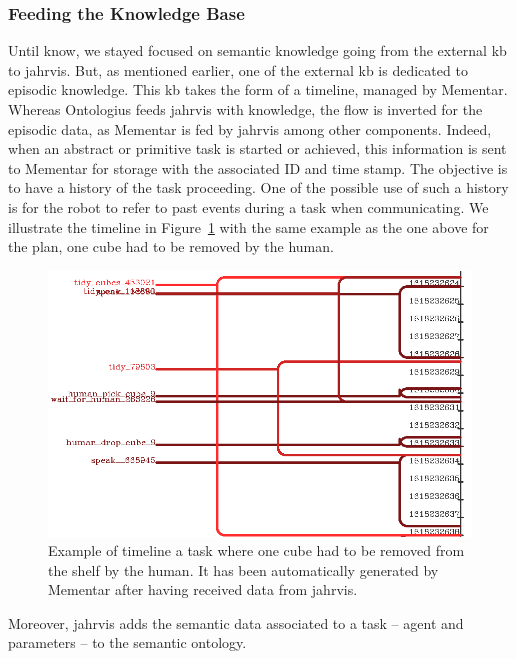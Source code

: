 \documentclass[a4paper,11pt,twoside]{StyleThese}
\begin{document}
\subsubsection{Feeding the Knowledge Base}\label{chap2:subsec:feeding}
Until know, we stayed focused on semantic knowledge going from the external \acrshort{kb} to \acrshort{jahrvis}. But, as mentioned earlier, one of the external \acrshort{kb} is dedicated to episodic knowledge. This \acrshort{kb} takes the form of a timeline, managed by Mementar. Whereas Ontologius feeds \acrshort{jahrvis} with knowledge, the flow is inverted for the episodic data, as Mementar is fed by \acrshort{jahrvis} among other components. Indeed, when an abstract or primitive task is started or achieved, this information is sent to Mementar for storage with the associated ID and time stamp. The objective is to have a history of the task proceeding. One of the possible use of such a history is for the robot to refer to past events during a task when communicating. We illustrate the timeline in Figure~\ref{chap2:fig:timeline} with the same example as the one above for the plan, one cube had to be removed by the human.

\begin{figure}[!ht]
	\includegraphics[width=\linewidth]{figures/chapter2/timeline.png}
	\caption{Example of timeline a task where one cube had to be removed from the shelf by the human. It has been automatically generated by Mementar after having received data from \acrshort{jahrvis}.}
	\label{chap2:fig:timeline}
\end{figure}

Moreover, \acrshort{jahrvis} adds the semantic data associated to a task -- agent and parameters -- to the semantic ontology.
\end{document}

